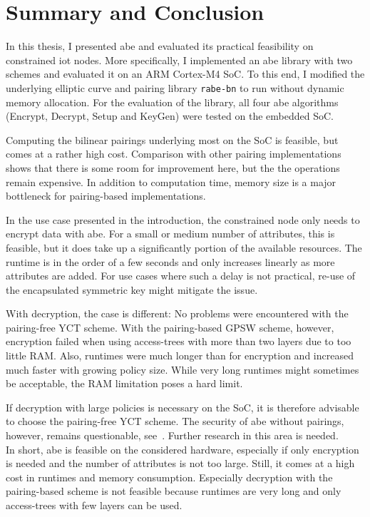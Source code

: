\chapter{Summary and Conclusion}

In this thesis, I presented \acrfull{abe} and evaluated its practical feasibility on constrained \acrshort{iot} nodes.
More specifically, I implemented an \acrshort{abe} library with two schemes and evaluated it on an ARM Cortex-M4 SoC.
To this end, I modified the underlying elliptic curve and pairing library \texttt{rabe-bn} to run without dynamic memory allocation.
For the evaluation of the library, all four \acrshort{abe} algorithms (Encrypt, Decrypt, Setup and KeyGen) were tested on the embedded SoC.

Computing the bilinear pairings underlying most  on the SoC is feasible, but comes at a rather high cost.
Comparison with other pairing implementations shows that there is some room for improvement here, but the the operations remain expensive.
In addition to computation time, memory size is a major bottleneck for pairing-based implementations.

In the use case presented in the introduction, the constrained node only needs to encrypt data with \acrshort{abe}.
For a small or medium number of attributes, this is feasible, but it does take up a significantly portion of the available resources.
The runtime is in the order of a few seconds and only increases linearly as more attributes are added.
For use cases where such a delay is not practical, re-use of the encapsulated symmetric key might mitigate the issue.

With decryption, the case is different: 
No problems were encountered with the pairing-free YCT scheme.
With the pairing-based GPSW scheme, however, encryption failed when using \glspl{access-tree} with more than two layers due to too little RAM.
Also, runtimes were much longer than for encryption and increased much faster with growing policy size.
While very long runtimes might sometimes be acceptable, the RAM limitation poses a hard limit.

If decryption with large policies is necessary on the SoC, it is therefore advisable to choose the pairing-free YCT scheme.
The security of \acrshort{abe} without pairings, however, remains questionable, see~\cite{herranz_attacking_2020}.
Further research in this area is needed.\\

In short, \acrlong{abe} is feasible on the considered hardware, especially if only encryption is needed and the number of attributes is not too large.
Still, it comes at a high cost in runtimes and memory consumption.
Especially decryption with the pairing-based scheme is not feasible because runtimes are very long and only \glspl{access-tree} with few layers can be used.